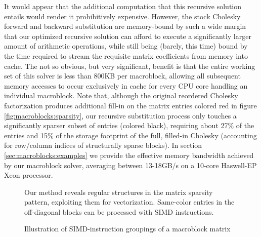 It would appear that the additional computation that this recursive
solution entails would render it prohibitively expensive. However, the
stock Cholesky forward and backward substitution are memory-bound by
such a wide margin that our optimized recursive solution can afford to
execute a significantly larger amount of arithmetic operations, while
still being (barely, this time) bound by the time required to stream
the requisite matrix coefficients from memory into cache. The not so
obvious, but very significant, benefit is that the entire working set
of this solver is less than 800KB per macroblock, allowing all
subsequent memory accesses to occur exclusively in cache for every CPU
core handling an individual macroblock. Note that, although the
original reordered Cholesky factorization produces additional fill-in
on the matrix entries colored red in figure \ref{fig:macroblocks:sparsity}, our
recursive substitution process only touches a significantly sparser
subset of entries (colored black), requiring about 27\% of the entries
and 15\% of the storage footprint of the full, filled-in Cholesky
(accounting for row/column indices of structurally sparse blocks). In
section \ref{sec:macroblocks:examples} we provide the effective memory bandwidth
achieved by our macroblock solver, averaging between 13-18GB/s on a
10-core Haswell-EP Xeon processor.

\begin{figure}[h]
\vspace*{-.35in}
\vspace*{-.1in}
\caption{Illustration of SIMD-instruction groupings of a macroblock
  matrix}{Our method reveals regular structures in the matrix sparsity
  pattern, exploiting them for vectorization. Same-color entries in
  the off-diagonal blocks can be processed with SIMD instructions.}
\label{fig:macroblocks:sparsity2}
\end{figure}

